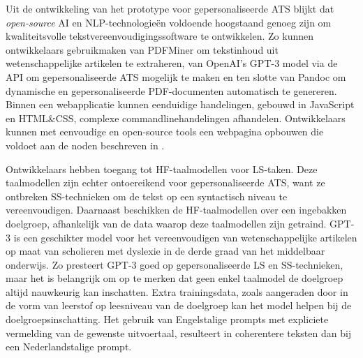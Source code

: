 \medspace

Uit de ontwikkeling van het prototype voor gepersonaliseerde ATS blijkt dat \textit{open-source} AI en NLP-technologieën voldoende hoogstaand genoeg zijn om kwaliteitsvolle tekstvereenvoudigingssoftware te ontwikkelen. Zo kunnen ontwikkelaars gebruikmaken van PDFMiner om tekstinhoud uit wetenschappelijke artikelen te extraheren, van OpenAI's GPT-3 model via de API om gepersonaliseerde ATS mogelijk te maken en ten slotte van Pandoc om dynamische en gepersonaliseerde PDF-documenten automatisch te genereren. Binnen een webapplicatie kunnen eenduidige handelingen, gebouwd in JavaScript en HTML\&CSS, complexe commandlinehandelingen afhandelen. Ontwikkelaars kunnen met eenvoudige en open-source tools een webpagina opbouwen die voldoet aan de noden beschreven in \textcite{Rello2012a}.

\medspace

Ontwikkelaars hebben toegang tot HF-taalmodellen voor LS-taken. Deze taalmodellen zijn echter ontoereikend voor gepersonaliseerde ATS, want ze ontbreken SS-technieken om de tekst op een syntactisch niveau te vereenvoudigen. Daarnaast beschikken de HF-taalmodellen over een ingebakken doelgroep, afhankelijk van de data waarop deze taalmodellen zijn getraind. GPT-3 is een geschikter model voor het vereenvoudigen van wetenschappelijke artikelen op maat van scholieren met dyslexie in de derde graad van het middelbaar onderwijs. Zo presteert GPT-3 goed op gepersonaliseerde LS en SS-technieken, maar het is belangrijk om op te merken dat geen enkel taalmodel de doelgroep altijd nauwkeurig kan inschatten. Extra trainingsdata, zoals aangeraden door \textcite{Gooding2022} in de vorm van leerstof op leesniveau van de doelgroep kan het model helpen bij de doelgroepsinschatting. Het gebruik van Engelstalige prompts met expliciete vermelding van de gewenste uitvoertaal, resulteert in coherentere teksten dan bij een Nederlandstalige prompt.